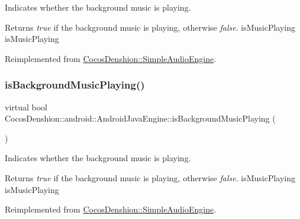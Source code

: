 Indicates whether the background music is playing.

\begin{DoxyReturn}{Returns}
{\itshape true} if the background music is playing, otherwise {\itshape false}.  is\+Music\+Playing  is\+Music\+Playing 
\end{DoxyReturn}


Reimplemented from \hyperlink{classCocosDenshion_1_1SimpleAudioEngine_a657a39bd7259565a4571699c3e6d56fd}{Cocos\+Denshion\+::\+Simple\+Audio\+Engine}.

\mbox{\label{classCocosDenshion_1_1android_1_1AndroidJavaEngine_ac709dfafca7cee544b93cf91c0cf3d2d}} 
\subsubsection{\texorpdfstring{is\+Background\+Music\+Playing()}{isBackgroundMusicPlaying()}\hspace{0.1cm}{\footnotesize\ttfamily [2/2]}}
{\footnotesize\ttfamily virtual bool Cocos\+Denshion\+::android\+::\+Android\+Java\+Engine\+::is\+Background\+Music\+Playing (\begin{DoxyParamCaption}{ }\end{DoxyParamCaption})\hspace{0.3cm}{\ttfamily [virtual]}}

Indicates whether the background music is playing.

\begin{DoxyReturn}{Returns}
{\itshape true} if the background music is playing, otherwise {\itshape false}.  is\+Music\+Playing  is\+Music\+Playing 
\end{DoxyReturn}


Reimplemented from \hyperlink{classCocosDenshion_1_1SimpleAudioEngine_a657a39bd7259565a4571699c3e6d56fd}{Cocos\+Denshion\+::\+Simple\+Audio\+Engine}.

\mbox{\label{classCocosDenshion_1_1android_1_1AndroidJavaEngine_a6f43c4386764a96b0fd604d2bf527274}} 
